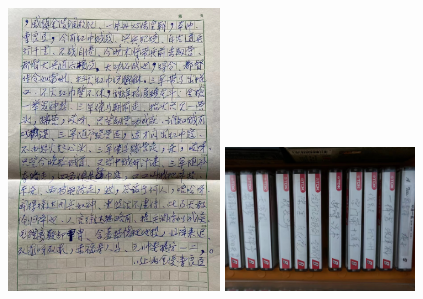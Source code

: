 \documentclass[cjk,slidestop,compress,mathserif,blue]{beamer}
\begin{document}
\frame
{
	\frametitle{}
\begin{figure}[h!]
\centering
\vspace{-0.15in}
\includegraphics[height=0.72\textwidth,width=0.50\textwidth,clip]{Figures/PekOpe_Liu-1.jpg}
\hskip 1pt
\includegraphics[height=0.35\textwidth,width=0.45\textwidth,clip]{Figures/PekOpe_Liu-2.jpg}
\label{Liu_Zengfu-2}
\end{figure}
}
\end{document}
